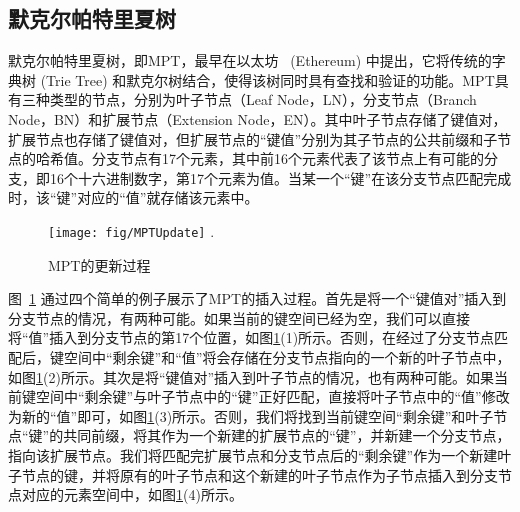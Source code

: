 \subsection{默克尔帕特里夏树}
默克尔帕特里夏树，即MPT，最早在以太坊~ \cite{wood2014ethereum, merklepatriciatree} (Ethereum) 中提出，它将传统的字典树 (Trie Tree) 和默克尔树结合，使得该树同时具有查找和验证的功能。MPT具有三种类型的节点，分别为叶子节点（Leaf Node，LN），分支节点（Branch Node，BN）和扩展节点（Extension Node，EN）。其中叶子节点存储了键值对，扩展节点也存储了键值对，但扩展节点的“键值”分别为其子节点的公共前缀和子节点的哈希值。分支节点有17个元素，其中前16个元素代表了该节点上有可能的分支，即16个十六进制数字，第17个元素为值。当某一个“键”在该分支节点匹配完成时，该“键”对应的“值”就存储该元素中。

\begin{figure}[t]
\centering
\texttt{[image: fig/MPTUpdate]}
\DeclareGraphicsExtensions.
\caption{MPT的更新过程}
\label{fig:MPTUpdate}
\end{figure}

图~\ref{fig:MPTUpdate} 通过四个简单的例子展示了MPT的插入过程。首先是将一个“键值对”插入到分支节点的情况，有两种可能。如果当前的键空间已经为空，我们可以直接将“值”插入到分支节点的第17个位置，如图\ref{fig:MPTUpdate}(1)所示。否则，在经过了分支节点匹配后，键空间中“剩余键”和“值”将会存储在分支节点指向的一个新的叶子节点中，如图\ref{fig:MPTUpdate}(2)所示。其次是将“键值对”插入到叶子节点的情况，也有两种可能。如果当前键空间中“剩余键”与叶子节点中的“键”正好匹配，直接将叶子节点中的“值”修改为新的“值”即可，如图\ref{fig:MPTUpdate}(3)所示。否则，我们将找到当前键空间“剩余键”和叶子节点“键”的共同前缀，将其作为一个新建的扩展节点的“键”，并新建一个分支节点，指向该扩展节点。我们将匹配完扩展节点和分支节点后的“剩余键”作为一个新建叶子节点的键，并将原有的叶子节点和这个新建的叶子节点作为子节点插入到分支节点对应的元素空间中，如图\ref{fig:MPTUpdate}(4)所示。

